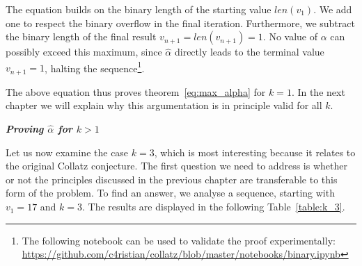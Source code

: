 \documentclass{SciPress_2015}
\renewcommand{\subsection}[1]{\textit{\textbf{#1}}}
\begin{document}
The equation builds on the binary length of the starting value $len(v_1)$. We add one to respect the binary overflow in the final iteration. Furthermore, we subtract the binary length of the final result $v_{n+1}=len(v_{n+1})=1$. No value of $\alpha$ can possibly exceed this maximum, since $\hat\alpha$ directly leads to the terminal value $v_{n+1}=1$, halting the sequence\footnote{The following notebook can be used to validate the proof experimentally:\\ \hspace*{7mm}\url{https://github.com/c4ristian/collatz/blob/master/notebooks/binary.ipynb}}.

\newpage
\par\noindent
The above equation thus proves theorem~\ref{eq:max_alpha} for $k=1$. In the next chapter we will explain why this argumentation is in principle valid for all $k$.

\vspace{1em}\noindent
\subsection{Proving \boldmath$\hat\alpha$ for \boldmath$k>1$}
\par\noindent
Let us now examine the case $k=3$, which is most interesting because it relates to the original Collatz conjecture. The first question we need to address is whether or not the principles discussed in the previous chapter are transferable to this form of the problem. To find an answer, we analyse a sequence, starting with $v_1=17$ and $k=3$. The results are displayed in the following Table~\ref{table:k_3}.
\end{document}
